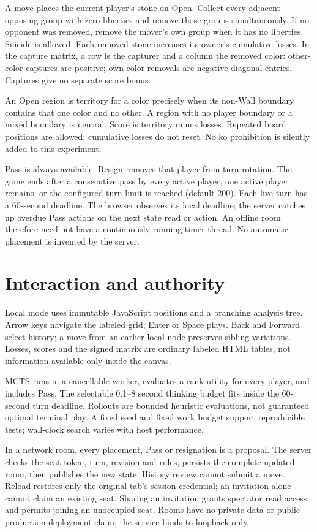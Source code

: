 \documentclass[11pt]{article}
\begin{document}
A move places the current player's stone on Open. Collect every adjacent
opposing group with zero liberties and remove those groups simultaneously.
If no opponent was removed, remove the mover's own group when it has no
liberties. Suicide is allowed. Each removed stone increases its owner's
cumulative losses. In the capture matrix, a row is the capturer and a column
the removed color: other-color captures are positive; own-color removals
are negative diagonal entries. Captures give no separate score bonus.

An Open region is territory for a color precisely when its non-Wall boundary
contains that one color and no other. A region with no player boundary or a
mixed boundary is neutral. Score is territory minus losses. Repeated board
positions are allowed; cumulative losses do not reset. No ko prohibition is
silently added to this experiment.

Pass is always available. Resign removes that player from turn rotation.
The game ends after a consecutive pass by every active player, one active
player remains, or the configured turn limit is reached (default 200).
Each live turn has a 60-second deadline. The browser observes its local
deadline; the server catches up overdue Pass actions on the next state read
or action. An offline room therefore need not have a continuously running
timer thread. No automatic placement is invented by the server.

\section*{Interaction and authority}
Local mode uses immutable JavaScript positions and a branching analysis tree.
Arrow keys navigate the labeled grid; Enter or Space plays. Back and Forward
select history; a move from an earlier local node preserves sibling variations.
Losses, scores and the signed matrix are ordinary labeled HTML tables, not
information available only inside the canvas.

MCTS runs in a cancellable worker, evaluates a rank utility for every player,
and includes Pass. The selectable 0.1--8 second thinking budget fits inside
the 60-second turn deadline. Rollouts are bounded heuristic evaluations, not
guaranteed optimal terminal play. A fixed seed and fixed work budget support
reproducible tests; wall-clock search varies with host performance.

In a network room, every placement, Pass or resignation is a proposal. The
server checks the seat token, turn, revision and rules, persists the complete
updated room, then publishes the new state. History review cannot submit a
move. Reload restores only the original tab's session credential; an invitation
alone cannot claim an existing seat. Sharing an invitation grants spectator
read access and permits joining an unoccupied seat. Rooms have no private-data
or public-production deployment claim; the service binds to loopback only.
\end{document}
